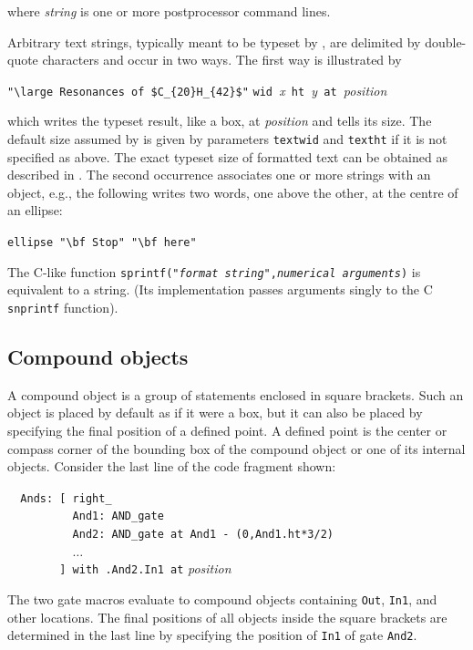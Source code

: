 \noindent where {\sl string} is one or more postprocessor command lines.

Arbitrary text strings, typically meant to be typeset by \latex, are
delimited by double-quote characters and occur in two ways.  The first
way is illustrated by

\verb|"\large Resonances of $C_{20}H_{42}$"|
 \verb|wid |{\sl x}\verb| ht |{\sl y}\verb| at |{\sl position}

\noindent
which writes the typeset result, like a box, at {\sl position} and tells
\pic its size.  The default size assumed by \pic is given by parameters
{\tt textwid} and {\tt textht} if it is not specified as above.
The exact typeset size of formatted text can be obtained
as described in .  The second occurrence
associates one or more strings with an object, e.g., the following writes
two words, one above the other, at the centre of an ellipse:

\verb|ellipse "\bf Stop" "\bf here"|

\noindent
The C-like \pic function
 {\tt sprintf("{\sl format string}",{\sl numerical arguments})}
is equivalent to a string.
(Its implementation passes arguments singly to the C {\tt snprintf}
function).

\subsection{Compound objects\label{Compoundobjects:}}
A compound object is a group of statements enclosed in square
brackets.  Such an object is placed by default as if it were a box, but
it can also be placed by specifying the final position of a defined point.
A defined point is the center or compass corner of the bounding box
of the compound object or one of its internal objects.
Consider the last line of the code fragment shown:

\noindent%
\verb|  Ands: [ right_|\\
\verb|          And1: AND_gate|\\
\verb|          And2: AND_gate at And1 - (0,And1.ht*3/2)|\\
\verb|          |$\ldots$\\
\verb|        ] with .And2.In1 at| {\sl position} %

The two gate macros evaluate to compound objects containing {\tt Out},
{\tt In1}, and other locations.  The final positions of all objects
inside the square brackets are determined in the last line by
specifying the position of {\tt In1} of gate {\tt And2}.

